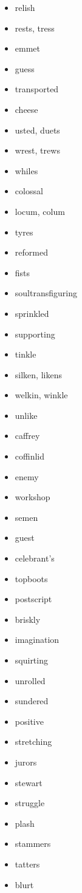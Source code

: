 \documentclass{article}
\begin{document}
\begin{itemize}
    \item relish
    \item rests, tress
    \item emmet
    \item guess
    \item transported
    \item cheese
    \item usted, duets
    \item wrest, trews
    \item whiles
    \item colossal
    \item locum, colum
    \item tyres
    \item reformed
    \item fists
    \item soultransfiguring
    \item sprinkled
    \item supporting
    \item tinkle
    \item silken, likens
    \item welkin, winkle
    \item unlike
    \item caffrey
    \item coffinlid
    \item enemy
    \item workshop
    \item semen
    \item guest
    \item celebrant's
    \item topboots
    \item postscript
    \item briskly
    \item imagination
    \item squirting
    \item unrolled
    \item sundered
    \item positive
    \item stretching
    \item jurors
    \item stewart
    \item struggle
    \item plash
    \item stammers
    \item tatters
    \item blurt

\end{itemize}
\end{document}
